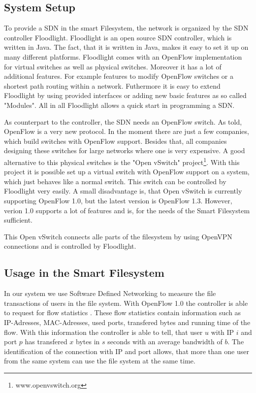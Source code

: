 \subsection{System Setup}
To provide a SDN in the smart Filesystem, the network is organized by the SDN controller Floodlight\cite{flood}. Floodlight is an open source SDN controller, which is written in Java. The fact, that it is written in Java, makes it easy to set it up on many different platforms. Floodlight comes with an OpenFlow implementation for virtual switches as well as physical switches. Moreover it has a lot of additional features. For example features to modify OpenFlow switches or a shortest path routing within a network. Futhermore it is easy to extend Floodlight by using provided interfaces or adding new basic features as so called "Modules". All in all Floodlight allows a quick start in programming a SDN.

As counterpart to the controller, the SDN needs an OpenFlow switch. As told, OpenFlow is a very new protocol. In the moment there are just a few companies, which build switches with OpenFlow support. Besides that, all companies designing these switches for large networks where one is very expensive. A good alternative to this physical switches is the "Open vSwitch" project\footnote{www.openvswitch.org}. With this project it is possible set up a virtual switch with OpenFlow support on a system, which just behaves like a normal switch. This switch can be controlled by Floodlight very easily. A small disadvantage is, that Open vSwitch is currently supporting OpenFlow 1.0\cite{ofspec}, but the latest version is OpenFlow 1.3. However, verion 1.0 supports a lot of features and is, for the needs of the Smart Filesystem sufficient.

This Open vSwitch connects alle parts of the filesystem by using OpenVPN connections and is controlled by Floodlight.     
   
\subsection{Usage in the Smart Filesystem}\label{usage}
In our system we use Software Defined Networking to measure the file transactions of users in the file system. With OpenFlow 1.0 the controller is able to request for flow statistics \cite[P. 31]{ofspec}. These flow statistics contain information such as IP-Adresses, MAC-Adresses, used ports, transfered bytes and running time of the flow. With this information the controller is able to tell, that user $u$ with IP $i$ and port $p$ has transfered $x$ bytes in $s$ seconds with an average bandwidth of $b$. The identification of the connection with IP and port allows, that more than one user from the same system can use the file system at the same time.

